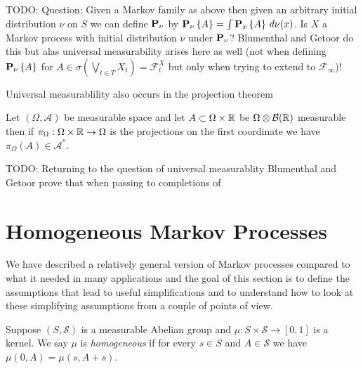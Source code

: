 TODO: Question:  Given a Markov family as above then given an arbitrary
initial distribution $\nu$ on $S$ we can define $\probabilityop_\nu$
by $\sprobability{A}{\nu} = \int \sprobability{A}{x} \, d\nu(x)$.  Is
$X$ a Markov process with initial distribution $\nu$ under $\probabilityop_\nu$?  Blumenthal and Getoor do this
but alas universal measurability arises here as well (not when defining
$\sprobability{A}{\nu}$ for $A \in \sigma(\bigvee_{t \in T} X_t)=\mathcal{F}^X_t$ but only when trying to extend to $\mathcal{F}_\infty$)!

Universal measurablility also occurs in the projection theorem
\begin{thm} Let $(\Omega, \mathcal{A})$ be measurable space and let $A \subset \Omega \times \reals$ be $\Omega \otimes \mathcal{B}(\reals)$ measurable then
  if $\pi_\Omega : \Omega \times \reals \to \Omega$ is the projections on the first coordinate we have $\pi_\Omega(A) \in \mathcal{A}^*$.
\end{thm}

TODO: Returning to the question of universal measurablity Blumenthal and Getoor prove that when passing to completions of 

\section{Homogeneous Markov Processes}

We have described a relatively general version of Markov processes
compared to what it needed in many applications and the goal of this
section is to define the assumptions that lead to useful
simplifications and to understand how to look at these simplifying
assumptions from a couple of points of view.

\begin{defn}Suppose $(S, \mathcal{S})$ is a measurable Abelian group
  and $\mu : S \times \mathcal{S} \to [0,1]$ is a kernel.  We say
  $\mu$ is \emph{homogeneous} if for every $s \in S$ and
  $A\in \mathcal{S}$ we have $\mu(0, A) = \mu(s, A+s)$.
\end{defn}

